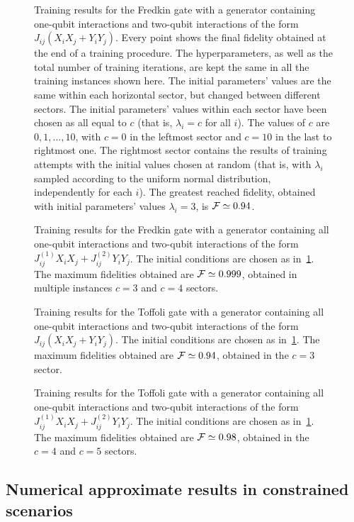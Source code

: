 \begin{figure}[htbp]
	\centering
	\caption{
		Training results for the Fredkin gate with a generator containing one-qubit interactions and two-qubit interactions of the form $J_{ij}(X_i X_j + Y_i Y_j)$.
		Every point shows the final fidelity obtained at the end of a training procedure.
		The hyperparameters, as well as the total number of training iterations, are kept the same in all the training instances shown here.
		The initial parameters' values are the same within each horizontal sector, but changed between different sectors.
		The initial parameters' values within each sector have been chosen as all equal to $c$ (that is, $\lambda_i=c$ for all $i$). The values of $c$ are $0, 1,..., 10$, with $c=0$ in the leftmost sector and $c=10$ in the last to rightmost one.
		The rightmost sector contains the results of training attempts with the initial values chosen at random (that is, with $\lambda_i$ sampled according to the uniform normal distribution, independently for each $i$).
		The greatest reached fidelity, obtained with initial parameters' values $\lambda_i=3$, is $\mathcal{F}\simeq0.94$.
	}
	\label{fig:fredkin_XX}
\end{figure}

\begin{figure}[htbp]
	\centering
	\caption{
		Training results for the Fredkin gate with a generator containing all one-qubit interactions and two-qubit interactions of the form $J^{(1)}_{ij}X_i X_j + J^{(2)}_{ij}Y_i Y_j$.
		The initial conditions are chosen as in~\cref{fig:fredkin_XX}.
		The maximum fidelities obtained are $\mathcal{F}\simeq0.999$, obtained in multiple instances $c=3$ and $c=4$ sectors.
	}
	\label{fig:fredkin_XY}
\end{figure}

\begin{figure}[htbp]
	\centering
	\caption{
		Training results for the Toffoli gate with a generator containing all one-qubit interactions and two-qubit interactions of the form $J_{ij}(X_i X_j + Y_i Y_j)$.
		The initial conditions are chosen as in~\cref{fig:fredkin_XX}.
		The maximum fidelities obtained are $\mathcal{F}\simeq0.94$, obtained in the $c=3$ sector.
	}
	\label{fig:toffoli_XX}
\end{figure}

\begin{figure}[htbp]
	\centering
	\caption{
		Training results for the Toffoli gate with a generator containing all one-qubit interactions and two-qubit interactions of the form $J^{(1)}_{ij}X_i X_j + J^{(2)}_{ij}Y_i Y_j$.
		The initial conditions are chosen as in~\cref{fig:fredkin_XX}.
		The maximum fidelities obtained are $\mathcal{F}\simeq0.98$, obtained in the $c=4$ and $c=5$ sectors.
	}
	\label{fig:toffoli_XY}
\end{figure}

\subsection{Numerical approximate results in constrained scenarios}

